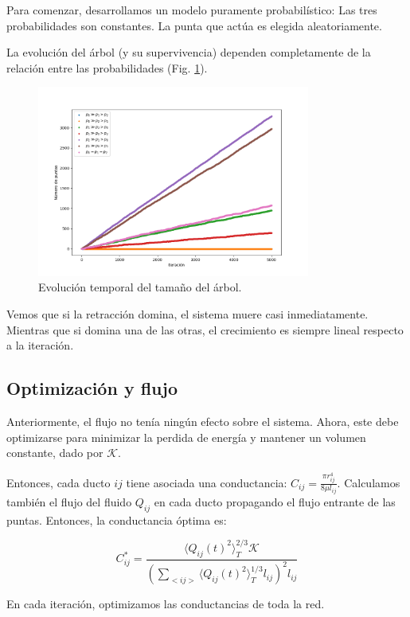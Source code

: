 \documentclass{article}
\begin{document}
Para comenzar, desarrollamos un modelo puramente probabilístico: Las tres probabilidades son constantes. La punta que actúa es elegida aleatoriamente.

La evolución del árbol (y su supervivencia) dependen completamente de la relación entre las probabilidades (Fig. \ref{fig:evolucion_tamano_proba}). 

\begin{figure}[h!]
    \centering
    \includegraphics[width=0.8\textwidth]{graficos_proba/N(t)_comparado.png}
    \caption{Evolución temporal del tamaño del árbol.}
    \label{fig:evolucion_tamano_proba}
\end{figure}

Vemos que si la retracción domina, el sistema muere casi inmediatamente. Mientras que si domina una de las otras, el crecimiento es siempre lineal respecto a la iteración.

\subsection{Optimización y flujo}

Anteriormente, el flujo no tenía ningún efecto sobre el sistema. Ahora, este debe optimizarse para minimizar la perdida de energía y mantener un volumen constante, dado por $\mathcal{K}$.

Entonces, cada ducto $ij$ tiene asociada una conductancia: $C_{ij} = \frac{\pi r_{ij}^4}{8\mu l_{ij}}$. Calculamos también el flujo del fluido $Q_{ij}$ en cada ducto propagando el flujo entrante de las puntas. Entonces, la conductancia óptima es:

$$ C_{ij}^* = \frac{\langle Q_{ij}(t)^2\rangle_T^{2/3} \mathcal{K}}{\left( \sum_{<ij>} \langle Q_{ij}(t)^2\rangle_T^{1/3} l_{ij}\right)^2 l_{ij}} $$

En cada iteración, optimizamos las conductancias de toda la red.
\end{document}
